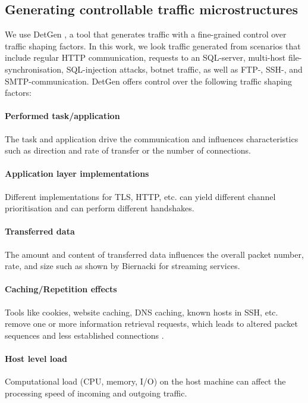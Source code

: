 \documentclass[10pt,conference]{IEEEtran}
\begin{document}
\subsection{Generating controllable traffic microstructures}\label{Control}

We use DetGen \cite{clausen2020traffic}, a tool that generates traffic with a fine-grained control over traffic shaping factors. In this work, we look traffic generated from scenarios that include regular HTTP communication, requests to an SQL-server, multi-host file-synchronisation, SQL-injection attacks, botnet traffic, as well as FTP-, SSH-, and SMTP-communication. DetGen offers control over the following traffic shaping factors:
 
\paragraph{Performed task/application}
The task and application drive the communication and influences characteristics such as direction and rate of transfer or the number of connections.%


\paragraph{Application layer implementations}
Different implementations for TLS, HTTP, etc. can yield different channel prioritisation and can perform different handshakes.

\paragraph{Transferred data} 
The amount and content of transferred data influences the overall packet number, rate, and size such as shown by Biernacki \cite{biernacki2017analysis} for streaming services.


\paragraph{Caching/Repetition effects}
Tools like cookies, website caching, DNS caching, known hosts in SSH, etc. remove one or more information retrieval requests, which leads to altered packet sequences and less established connections \cite{fricker2012impact}.


\paragraph{Host level load}
Computational load (CPU, memory, I/O) on the host machine can affect the processing speed of incoming and outgoing traffic.
\end{document}
